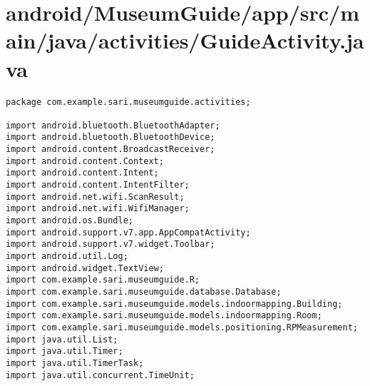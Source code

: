 \section{android/MuseumGuide/app/src/main/java/activities/GuideActivity.java}
\begin{lstlisting}package com.example.sari.museumguide.activities;

import android.bluetooth.BluetoothAdapter;
import android.bluetooth.BluetoothDevice;
import android.content.BroadcastReceiver;
import android.content.Context;
import android.content.Intent;
import android.content.IntentFilter;
import android.net.wifi.ScanResult;
import android.net.wifi.WifiManager;
import android.os.Bundle;
import android.support.v7.app.AppCompatActivity;
import android.support.v7.widget.Toolbar;
import android.util.Log;
import android.widget.TextView;
import com.example.sari.museumguide.R;
import com.example.sari.museumguide.database.Database;
import com.example.sari.museumguide.models.indoormapping.Building;
import com.example.sari.museumguide.models.indoormapping.Room;
import com.example.sari.museumguide.models.positioning.RPMeasurement;
import java.util.List;
import java.util.Timer;
import java.util.TimerTask;
import java.util.concurrent.TimeUnit;


\end{lstlisting}
